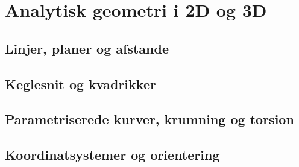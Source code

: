 \chapter{Analytisk geometri i 2D og 3D}
\section{Linjer, planer og afstande}
\leavevmode\par

\section{Keglesnit og kvadrikker}
\leavevmode\par

\section{Parametriserede kurver, krumning og torsion}
\leavevmode\par

\section{Koordinatsystemer og orientering}
\leavevmode\par
